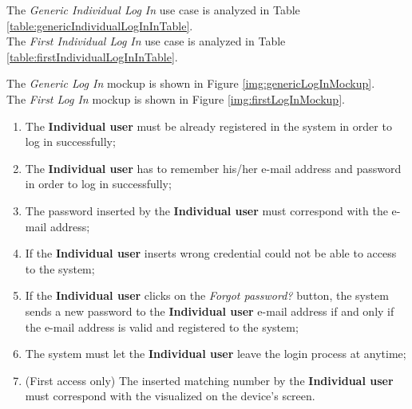 The \textit{Generic Individual Log In} use case is analyzed in Table \ref{table:genericIndividualLogInInTable}.\\
The \textit{First Individual Log In} use case is analyzed in Table \ref{table:firstIndividualLogInInTable}.

The \textit{Generic Log In} mockup is shown in Figure \ref{img:genericLogInMockup}. \\
The \textit{First Log In} mockup is shown in Figure \ref{img:firstLogInMockup}.

\begin{enumerate}
  \item The \textbf{Individual user} must be already registered in the system in order to log in successfully;
  \item The \textbf{Individual user} has to remember his/her e-mail address and password in order to log in successfully;
  \item The password inserted by the \textbf{Individual user} must correspond with the e-mail address;
  \item If the \textbf{Individual user} inserts wrong credential could not be able to access to the system;
  \item If the \textbf{Individual user} clicks on the \textit{Forgot password?} button, the system sends a new password to the \textbf{Individual user} e-mail address if and only if the e-mail address is valid and registered to the system;
  \item The system must let the \textbf{Individual user} leave the login process at anytime;
  \item (First access only) The inserted matching number by the \textbf{Individual user} must correspond with the visualized on the device's screen.
\end{enumerate}

